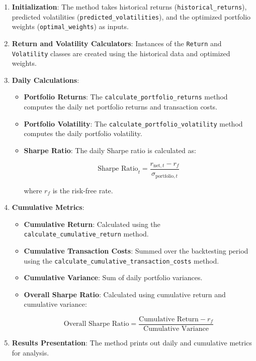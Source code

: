 \begin{enumerate}
    \item \textbf{Initialization}: The method takes historical returns (\texttt{historical\_returns}), predicted volatilities (\texttt{predicted\_volatilities}), and the optimized portfolio weights (\texttt{optimal\_weights}) as inputs.
    \item \textbf{Return and Volatility Calculators}: Instances of the \texttt{Return} and \texttt{Volatility} classes are created using the historical data and optimized weights.
    \item \textbf{Daily Calculations}:
    \begin{itemize}
        \item \textbf{Portfolio Returns}: The \texttt{calculate\_portfolio\_returns} method computes the daily net portfolio returns and transaction costs.
        \item \textbf{Portfolio Volatility}: The \texttt{calculate\_portfolio\_volatility} method computes the daily portfolio volatility.
        \item \textbf{Sharpe Ratio}: The daily Sharpe ratio is calculated as:

        \[
        \text{Sharpe Ratio}_t = \frac{r_{\text{net}, t} - r_f}{\sigma_{\text{portfolio}, t}}
        \]

        where \( r_f \) is the risk-free rate.
    \end{itemize}
    \item \textbf{Cumulative Metrics}:
    \begin{itemize}
        \item \textbf{Cumulative Return}: Calculated using the \texttt{calculate\_cumulative\_return} method.
        \item \textbf{Cumulative Transaction Costs}: Summed over the backtesting period using the \texttt{calculate\_cumulative\_transaction\_costs} method.
        \item \textbf{Cumulative Variance}: Sum of daily portfolio variances.
        \item \textbf{Overall Sharpe Ratio}: Calculated using cumulative return and cumulative variance:

        \[
        \text{Overall Sharpe Ratio} = \frac{\text{Cumulative Return} - r_f}{\text{Cumulative Variance}}
        \]
    \end{itemize}
    \item \textbf{Results Presentation}: The method prints out daily and cumulative metrics for analysis.
\end{enumerate}

